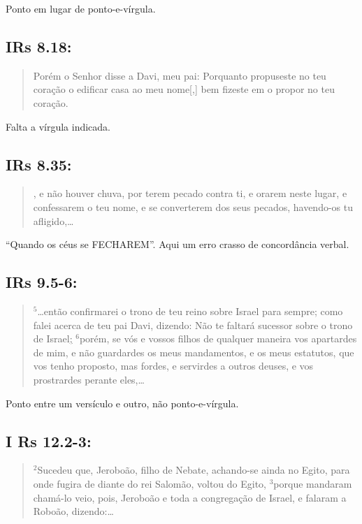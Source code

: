 Ponto em lugar de ponto-e-vírgula.

\subsection{IRs 8.18:}
\begin{quote}
    \small
Porém o Senhor disse a Davi, meu pai: Porquanto propuseste no teu coração o edificar casa ao meu nome[,] bem fizeste em o propor no teu coração.
\end{quote}

Falta a vírgula indicada.

\subsection{IRs 8.35:}
\begin{quote}
    \small
{}, e não houver chuva, por terem pecado contra ti, e orarem neste lugar, e confessarem o teu nome, e se converterem dos seus pecados, havendo-os tu afligido,\ldots
\end{quote}

``Quando os céus se FECHAREM''. Aqui um erro crasso de concordância verbal.

\subsection{ IRs 9.5-6:}
\begin{quote}
    \small
$^{\mathrm{5}}$\ldots então confirmarei o trono de teu reino sobre Israel para sempre; como falei acerca de teu pai Davi, dizendo: Não te faltará sucessor sobre o trono de Israel\uline{;} $^{\mathrm{6}}$porém, se vós e vossos filhos de qualquer maneira vos apartardes de mim, e não guardardes os meus mandamentos, e os meus estatutos, que vos tenho proposto, mas fordes, e servirdes a outros deuses, e vos prostrardes perante eles,\ldots
\end{quote}

Ponto entre um versículo e outro, não ponto-e-vírgula.

\subsection{I Rs 12.2-3:}
\begin{quote}
    \small
$^{\mathrm{2}}$Sucedeu que, Jeroboão, filho de Nebate, achando-se ainda no Egito, para onde fugira de diante do rei Salomão, voltou do Egito, $^{\mathrm{3}}$porque mandaram chamá-lo\uwave{;} veio, pois, Jeroboão e toda a congregação de Israel, e falaram a Roboão, dizendo:\ldots
\end{quote}

